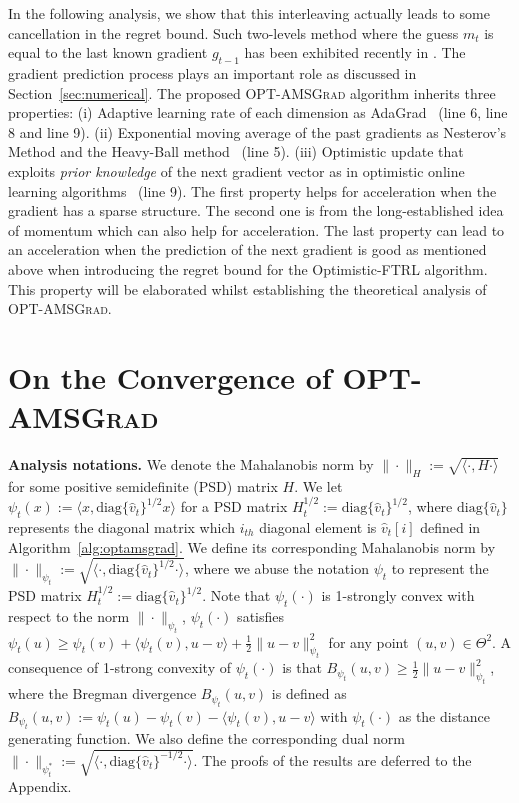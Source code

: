 \documentclass[wcp]{jmlr}
\begin{document}
In the following analysis, we show that this interleaving actually leads to some cancellation in the regret bound.
Such two-levels method where the guess $m_t$ is equal to the last known gradient $g_{t-1}$ has been exhibited recently in \citep{CJ12}.
The gradient prediction process plays an important role as discussed in Section~\ref{sec:numerical}.
The proposed \textsc{OPT-AMSGrad} algorithm inherits three properties: \textsf{(i)} Adaptive learning rate of each dimension as AdaGrad~\citep{DHS11} (line 6, line 8 and line 9). \textsf{(ii)} Exponential moving average of the past gradients as Nesterov's Method \citep{N04} and the Heavy-Ball method~\citep{P64} (line 5). \textsf{(iii)} Optimistic update that exploits \emph{prior knowledge} of the next gradient vector as in optimistic online learning algorithms~\citep{CJ12,RS13b,SALS15} (line 9).
The first property helps for acceleration when the gradient has a sparse structure.
The second one is from the long-established idea of momentum which can also help for acceleration. 
The last property can lead to an acceleration when the prediction of the next gradient is good as mentioned above when introducing the regret bound for the Optimistic-FTRL algorithm.
This property will be elaborated whilst establishing the theoretical analysis of \textsc{OPT-AMSGrad}.




\vspace{-0.05in}
\section{On the Convergence of \textsc{OPT-AMSGrad}}\label{sec:analysis}


\textbf{Analysis notations.}\hspace{0.1in}
We denote the Mahalanobis norm by $\|\cdot\|_H := \sqrt{ \langle \cdot, H \cdot \rangle }$ for some positive semidefinite (PSD) matrix $H$.
We let $\psi_t(x) := \langle x, \text{diag}\{\hat{v}_t\}^{1/2} x \rangle$ for a PSD matrix $H_t^{1/2}:= \text{diag}\{\hat{v}_t\}^{1/2}$, where $\text{diag}\{\hat{v}_t\}$ represents the diagonal matrix which $i_{th}$ diagonal element is $\hat{v}_t[i]$ defined in Algorithm~\ref{alg:optamsgrad}.
We define its corresponding Mahalanobis norm by $\| \cdot \|_{\psi_t}:=  \sqrt{ \langle \cdot, \text{diag}\{\hat{v}_t\}^{1/2} \cdot \rangle }$,
where we abuse the notation $\psi_t$ to represent the PSD matrix $H_t^{1/2}:=\text{diag}\{\hat{v}_t\}^{1/2}$.
Note that $\psi_t(\cdot)$ is 1-strongly convex with respect to the norm $\| \cdot \|_{\psi_t}$, \ie $\psi_t(\cdot)$ satisfies $\psi_t(u) \geq \psi_t(v) + \langle \psi_t(v), u - v \rangle + \frac{1}{2} \| u - v\|^2_{\psi_t}$ for any point $(u,v) \in \Theta^2$.
A consequence of 1-strong convexity of $\psi_t(\cdot)$ is that $B_{\psi_t}(u,v) \geq \frac{1}{2} \| u - v \|^2_{\psi_t}$, where the Bregman divergence $B_{\psi_t}(u,v)$ is defined as $B_{\psi_t}(u,v) := \psi_t(u) - \psi_t(v) - \langle \psi_t(v), u - v \rangle$ with $\psi_t(\cdot)$ as the distance generating function.
We also define the corresponding dual norm $\| \cdot \|_{\psi_t^*}:= \sqrt{ \langle \cdot, \text{diag}\{\hat{v}_t\}^{-1/2} \cdot \rangle }$.
The proofs of the results are deferred to the Appendix.
\end{document}
